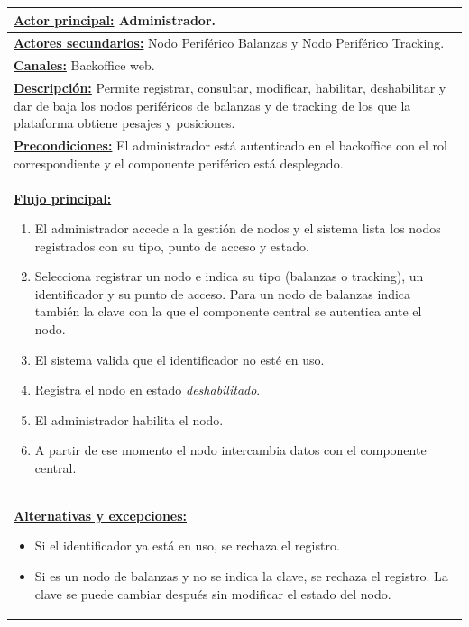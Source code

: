 \begin{table}[H]
\small
\setlength{\tabcolsep}{8pt}
\renewcommand{\arraystretch}{1.1}
\centering
\begin{tabular}{|p{15.8cm}|}
\hline
\textbf{\underline{Actor principal:}} Administrador. \\ \hline
\textbf{\underline{Actores secundarios:}} Nodo Periférico Balanzas y Nodo Periférico Tracking. \\ \hline
\textbf{\underline{Canales:}} Backoffice web. \\ \hline
\textbf{\underline{Descripción:}} Permite registrar, consultar, modificar, habilitar, deshabilitar y dar de baja los nodos periféricos de balanzas y de tracking de los que la plataforma obtiene pesajes y posiciones. \\ \hline
\textbf{\underline{Precondiciones:}} El administrador está autenticado en el backoffice con el rol correspondiente y el componente periférico está desplegado. \\ \hline
\textbf{\underline{Flujo principal:}}\par
\begin{enumerate}[leftmargin=*,topsep=2pt,itemsep=1pt,parsep=0pt,partopsep=0pt]
    \item El administrador accede a la gestión de nodos y el sistema lista los nodos registrados con su tipo, punto de acceso y estado.
    \item Selecciona registrar un nodo e indica su tipo (balanzas o tracking), un identificador y su punto de acceso. Para un nodo de balanzas indica también la clave con la que el componente central se autentica ante el nodo.
    \item El sistema valida que el identificador no esté en uso.
    \item Registra el nodo en estado \emph{deshabilitado}.
    \item El administrador habilita el nodo.
    \item A partir de ese momento el nodo intercambia datos con el componente central.
\end{enumerate} \\ \hline
\textbf{\underline{Alternativas y excepciones:}}\par
\begin{itemize}[leftmargin=*,topsep=2pt,itemsep=1pt,parsep=0pt,partopsep=0pt]
    \item Si el identificador ya está en uso, se rechaza el registro.
    \item Si es un nodo de balanzas y no se indica la clave, se rechaza el registro. La clave se puede cambiar después sin modificar el estado del nodo.

\end{itemize}
\end{tabular}
\end{table}

